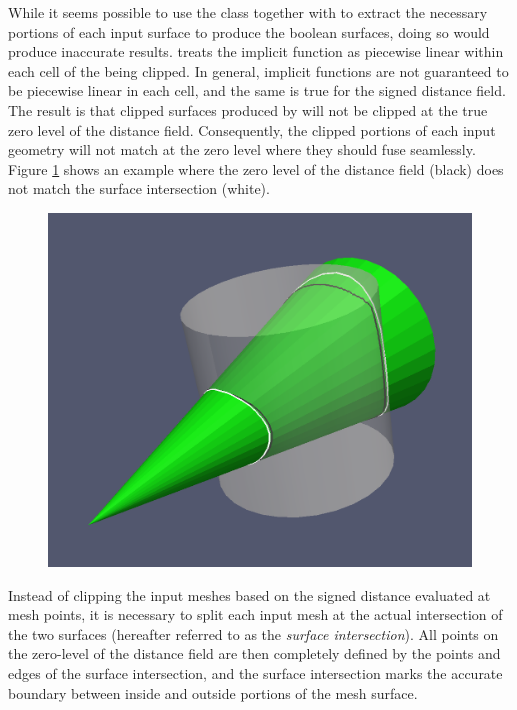 \documentclass{InsightArticle}
\begin{document}
While it seems possible to use the class  together with  to extract the necessary portions of each input surface to produce the boolean surfaces, doing so would produce inaccurate results.  treats the implicit function as piecewise linear within each cell of the  being clipped. In general, implicit functions are not guaranteed to be piecewise linear in each cell, and the same is true for the signed distance field. The result is that clipped surfaces produced by  will not be clipped at the true zero level of the distance field. Consequently, the clipped portions of each input geometry will not match at the zero level where they should fuse seamlessly. Figure \ref{fig:DistanceZeroLevelVsIntersection} shows an example where the zero level of the distance field (black) does not match the surface intersection (white). 

\begin{figure}[t]
\centering
\includegraphics[scale=0.25]{Figures/DistanceZeroLevelVsIntersection}
\label{fig:DistanceZeroLevelVsIntersection}
\end{figure}

Instead of clipping the input meshes based on the signed distance evaluated at mesh points, it is necessary to split each input mesh at the actual intersection of the two surfaces (hereafter referred to as the \emph{surface intersection}). All points on the zero-level of the distance field are then completely defined by the points and edges of the surface intersection, and the surface intersection marks the accurate boundary between inside and outside portions of the mesh surface.
\end{document}
